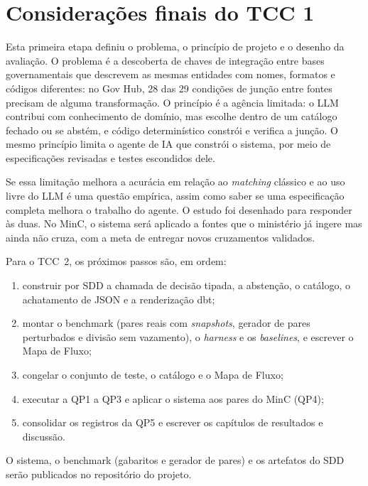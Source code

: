 \chapter{Considerações finais do TCC 1}
\label{chap:consideracoes}

Esta primeira etapa definiu o problema, o princípio de projeto e o desenho da
avaliação. O problema é a descoberta de chaves de integração entre bases
governamentais que descrevem as mesmas entidades com nomes, formatos e
códigos diferentes: no Gov Hub, 28 das 29 condições de junção entre fontes
precisam de alguma transformação. O princípio é a agência limitada: o LLM
contribui com conhecimento de domínio, mas escolhe dentro de um catálogo
fechado ou se abstém, e código determinístico constrói e verifica a junção. O
mesmo princípio limita o agente de IA que constrói o sistema, por meio de
especificações revisadas e testes escondidos dele.

Se essa limitação melhora a acurácia em relação ao \emph{matching} clássico e
ao uso livre do LLM é uma questão empírica, assim como saber se uma
especificação completa melhora o trabalho do agente. O estudo foi desenhado
para responder às duas. No MinC, o sistema será aplicado a fontes que o
ministério já ingere mas ainda não cruza, com a meta de entregar novos
cruzamentos validados.

Para o TCC~2, os próximos passos são, em ordem:

\begin{enumerate}
\item construir por SDD a chamada de decisão tipada, a abstenção, o catálogo,
o achatamento de JSON e a renderização dbt;
\item montar o benchmark (pares reais com \emph{snapshots}, gerador de pares
perturbados e divisão sem vazamento), o \emph{harness} e os
\emph{baselines}, e escrever o Mapa de Fluxo;
\item congelar o conjunto de teste, o catálogo e o Mapa de Fluxo;
\item executar a QP1 a QP3 e aplicar o sistema aos pares do MinC (QP4);
\item consolidar os registros da QP5 e escrever os capítulos de resultados e
discussão.
\end{enumerate}

O sistema, o benchmark (gabaritos e gerador de pares) e os artefatos do SDD
serão publicados no repositório do projeto.
